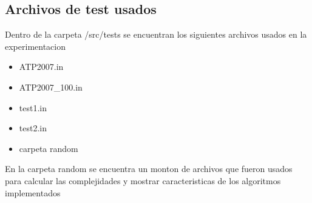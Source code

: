 \subsection{Archivos de test usados}
Dentro de la carpeta /src/tests se encuentran los siguientes archivos usados en la experimentacion
\begin{itemize}
 \item ATP2007.in
 \item ATP2007_100.in
 \item test1.in
 \item test2.in
 \item carpeta random
\end{itemize}

En la carpeta random se encuentra un monton de archivos que fueron usados
para calcular las complejidades y mostrar caracteristicas de los algoritmos implementados

